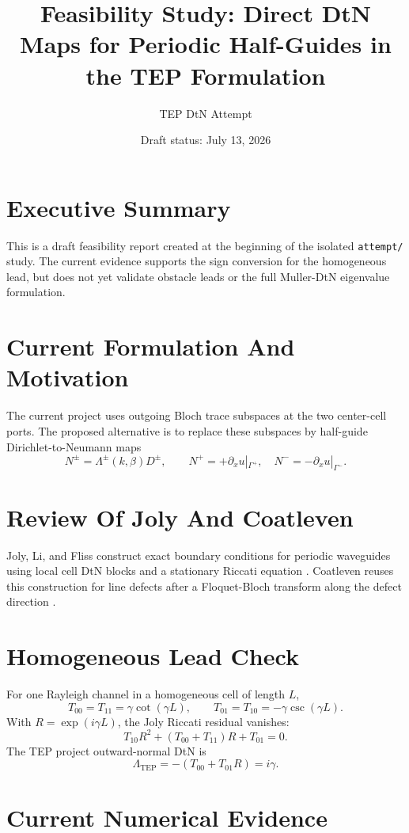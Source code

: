 \documentclass[11pt]{article}
\title{Feasibility Study: Direct DtN Maps for Periodic Half-Guides in the TEP Formulation}
\author{TEP DtN Attempt}
\date{Draft status: July 13, 2026}
\begin{document}
\maketitle

\section*{Executive Summary}

This is a draft feasibility report created at the beginning of the isolated
\texttt{attempt/} study. The current evidence supports the sign conversion for
the homogeneous lead, but does not yet validate obstacle leads or the full
Muller-DtN eigenvalue formulation.

\section{Current Formulation And Motivation}

The current project uses outgoing Bloch trace subspaces at the two center-cell
ports. The proposed alternative is to replace these subspaces by half-guide
Dirichlet-to-Neumann maps
\[
  N^\pm=\Lambda^\pm(k,\beta)D^\pm,
  \qquad
  N^+=+\partial_xu|_{\Gamma^+},\quad
  N^-=-\partial_xu|_{\Gamma^-}.
\]

\section{Review Of Joly And Coatleven}

Joly, Li, and Fliss construct exact boundary conditions for periodic
waveguides using local cell DtN blocks and a stationary Riccati equation
\cite{JolyLiFliss2006}. Coatleven reuses this construction for line defects
after a Floquet-Bloch transform along the defect direction \cite{Coatleven2012}.

\section{Homogeneous Lead Check}

For one Rayleigh channel in a homogeneous cell of length \(L\),
\[
  T_{00}=T_{11}=\gamma\cot(\gamma L),\qquad
  T_{01}=T_{10}=-\gamma\csc(\gamma L).
\]
With \(R=\exp(i\gamma L)\), the Joly Riccati residual vanishes:
\[
  T_{10}R^2+(T_{00}+T_{11})R+T_{01}=0.
\]
The TEP project outward-normal DtN is
\[
  \Lambda_{\mathrm{TEP}}=-(T_{00}+T_{01}R)=i\gamma.
\]

\section{Current Numerical Evidence}
\end{document}

